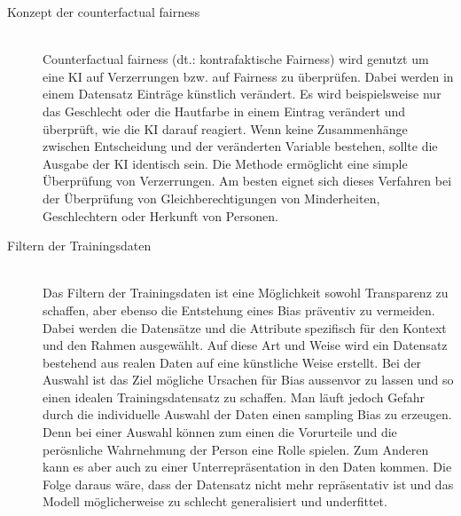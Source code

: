 \begin{onehalfspace}
\begin{description}
\begin{description}
                \item[Konzept der \glqq{}counterfactual fairness\grqq{}] \hfill \\
                \glqq{}Counterfactual fairness\grqq{} (\ac*{dt}.: kontrafaktische Fairness) wird genutzt um eine \ac*{KI} auf Verzerrungen bzw. auf Fairness zu überprüfen. Dabei werden in einem Datensatz Einträge künstlich verändert. Es wird beispielsweise nur das Geschlecht oder die Hautfarbe in einem Eintrag verändert und überprüft, wie die \ac*{KI} darauf reagiert. Wenn keine Zusammenhänge zwischen Entscheidung und der veränderten Variable bestehen, sollte die Ausgabe der \ac*{KI} identisch sein. Die Methode ermöglicht eine simple Überprüfung von Verzerrungen. Am besten eignet sich dieses Verfahren bei der Überprüfung von Gleichberechtigungen von Minderheiten, Geschlechtern oder Herkunft von Personen.\cite{hagendorff2019maschinelles}

                \item[Filtern der Trainingsdaten] \hfill \\
                Das Filtern der Trainingsdaten ist eine Möglichkeit sowohl Transparenz zu schaffen, aber ebenso die Entstehung eines Bias präventiv zu vermeiden. Dabei werden die Datensätze und die Attribute spezifisch für den Kontext und den Rahmen ausgewählt. Auf diese Art und Weise wird ein Datensatz bestehend aus realen Daten auf eine künstliche Weise erstellt. Bei der Auswahl ist das Ziel mögliche Ursachen für Bias aussenvor zu lassen und so einen idealen Trainingsdatensatz zu schaffen.
                Man läuft jedoch Gefahr durch die individuelle Auswahl der Daten einen sampling Bias zu erzeugen. Denn bei einer Auswahl können zum einen die Vorurteile und die perösnliche Wahrnehmung der Person eine Rolle spielen. Zum Anderen kann es aber auch zu einer Unterrepräsentation in den Daten kommen. Die Folge daraus wäre, dass der Datensatz nicht mehr repräsentativ ist und das Modell möglicherweise zu schlecht generalisiert und underfittet.\cite{Google}\cite{ntoutsi2020bias}

            \end{description}


\end{description}
\end{onehalfspace}
